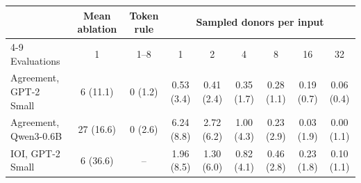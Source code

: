 \begin{tabular}{@{}lcccccccc@{}}
\toprule
 & Mean ablation & Token rule & \multicolumn{6}{c}{Sampled donors per input} \\
\cmidrule(l){4-9}
Evaluations & 1 & 1--8 & 1 & 2 & 4 & 8 & 16 & 32 \\
\midrule
Agreement, GPT-2 Small & 6 (11.1) & 0 (1.2) & 0.53 (3.4) & 0.41 (2.4) & 0.35 (1.7) & 0.28 (1.1) & 0.19 (0.7) & 0.06 (0.4) \\
Agreement, Qwen3-0.6B & 27 (16.6) & 0 (2.6) & 6.24 (8.8) & 2.72 (6.2) & 1.00 (4.3) & 0.23 (2.9) & 0.03 (1.9) & 0.00 (1.1) \\
IOI, GPT-2 Small & 6 (36.6) & -- & 1.96 (8.5) & 1.30 (6.0) & 0.82 (4.1) & 0.46 (2.8) & 0.23 (1.8) & 0.10 (1.1) \\
\bottomrule
\end{tabular}
